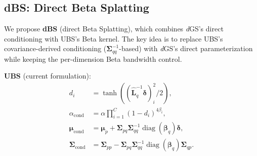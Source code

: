 \documentclass{article}
\newcommand{\modelname}{\textit{d}GS}
\theoremstyle{plain}
\theoremstyle{definition}
\theoremstyle{remark}
\begin{document}
\begin{table}[h]
\centering
\caption{Direct comparison of \modelname{} and UBS on shared static benchmarks (MCMC densification). Both use the same Gaussian budgets.}
\label{tab:dgs_vs_ubs}
\setlength{\tabcolsep}{4pt}
\end{table}

\subsection{dBS: Direct Beta Splatting}

We propose \textbf{dBS} (direct Beta Splatting), which combines \modelname{}'s direct conditioning with UBS's Beta kernel. The key idea is to replace UBS's covariance-derived conditioning ($\boldsymbol{\Sigma}_{qq}^{-1}$-based) with \modelname{}'s direct parameterization while keeping the per-dimension Beta bandwidth control.

\textbf{UBS} (current formulation):
\begin{align}
d_i &= \tanh\!\left((\hat{\mathbf{L}}_q^{-1} \boldsymbol{\delta})_i^2 / 2\right), \\
\alpha_{\text{cond}} &= \alpha \prod_{i=1}^{C} (1 - d_i)^{4\beta_i}, \\
\boldsymbol{\mu}_{\text{cond}} &= \boldsymbol{\mu}_p + \boldsymbol{\Sigma}_{pq} \boldsymbol{\Sigma}_{qq}^{-1} \operatorname{diag}(\boldsymbol{\beta}_q) \boldsymbol{\delta}, \\
\boldsymbol{\Sigma}_{\text{cond}} &= \boldsymbol{\Sigma}_{pp} - \boldsymbol{\Sigma}_{pq} \boldsymbol{\Sigma}_{qq}^{-1} \operatorname{diag}(\boldsymbol{\beta}_q) \boldsymbol{\Sigma}_{qp}.
\end{align}
\end{document}
